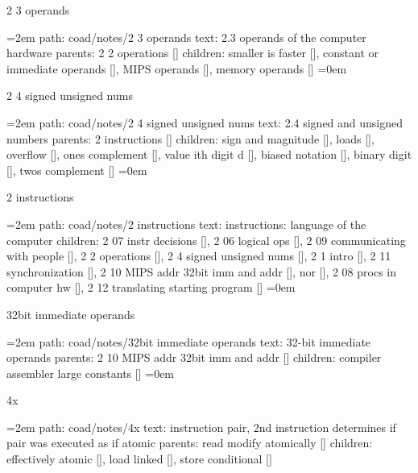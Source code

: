 \bigskip
{}
2 3 operands
\smallskip
\par\begingroup
\leftskip=2em
path: coad/notes/2 3 operands
\smallskip
text:  2.3 operands of the computer hardware
\smallskip
parents:  2 2 operations []
\smallskip
children: smaller is faster [], constant or immediate operands [], MIPS operands [], memory operands []
\smallskip
\leftskip=0em
\par\endgroup
\bigskip
{}
2 4 signed unsigned nums
\smallskip
\par\begingroup
\leftskip=2em
path: coad/notes/2 4 signed unsigned nums
\smallskip
text:  2.4 signed and unsigned numbers
\smallskip
parents:  2 instructions []
\smallskip
children: sign and magnitude [], loads [], overflow [], ones complement [], value ith digit d [], biased notation [], binary digit [], twos complement []
\smallskip
\leftskip=0em
\par\endgroup
\bigskip
{}
2 instructions
\smallskip
\par\begingroup
\leftskip=2em
path: coad/notes/2 instructions
\smallskip
text:  instructions: language of the computer
\smallskip
children: 2 07 instr decisions [], 2 06 logical ops [], 2 09 communicating with people [], 2 2 operations [], 2 4 signed unsigned nums [], 2 1 intro [], 2 11 synchronization [], 2 10 MIPS addr 32bit imm and addr [], nor [], 2 08 procs in computer hw [], 2 12 translating starting program []
\smallskip
\leftskip=0em
\par\endgroup
\bigskip
{}
32bit immediate operands
\smallskip
\par\begingroup
\leftskip=2em
path: coad/notes/32bit immediate operands
\smallskip
text:  32-bit immediate operands
\smallskip
parents:  2 10 MIPS addr 32bit imm and addr []
\smallskip
children: compiler assembler large constants []
\smallskip
\leftskip=0em
\par\endgroup
\bigskip
{}
4x
\smallskip
\par\begingroup
\leftskip=2em
path: coad/notes/4x
\smallskip
text:  instruction pair, 2nd instruction determines if pair was executed as if atomic
\smallskip
parents:  read modify atomically []
\smallskip
children: effectively atomic [], load linked [], store conditional []
\smallskip
